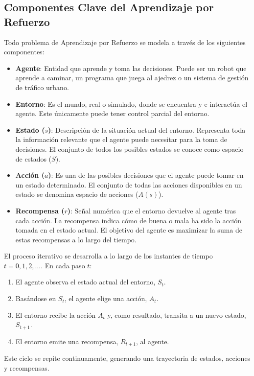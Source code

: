 \documentclass[12pt,a4paper]{book}
\begin{document}
\hrulefill

\subsection{Componentes Clave del Aprendizaje por Refuerzo}

Todo problema de Aprendizaje por Refuerzo se modela a través de los siguientes componentes:

\begin{itemize}
    \item \textbf{Agente}: Entidad que aprende y toma las decisiones. Puede ser un robot que aprende a caminar, un programa que juega al ajedrez o un sistema de gestión de tráfico urbano.
    \item \textbf{Entorno}: Es el mundo, real o simulado, donde se encuentra y e interactúa el agente. Este únicamente puede tener control parcial del entorno.
    \item \textbf{Estado ($s$)}: Descripción de la situación actual del entorno. Representa toda la información relevante que el agente puede necesitar para la toma de decisiones. El conjunto de todos los posibles estados se conoce como espacio de estados ($S$).
    \item \textbf{Acción ($a$)}: Es una de las posibles decisiones que el agente puede tomar en un estado determinado. El conjunto de todas las acciones disponibles en un estado se denomina espacio de acciones ($A(s)$).
    \item \textbf{Recompensa ($r$)}: Señal numérica que el entorno devuelve al agente tras cada acción. La recompensa indica cómo de buena o mala ha sido la acción tomada en el estado actual. El objetivo del agente es maximizar la suma de estas recompensas a lo largo del tiempo.
\end{itemize}

El proceso iterativo se desarrolla a lo largo de los instantes de tiempo $t=0, 1, 2, \dots$. En cada paso $t$:
\begin{enumerate}
    \item El agente observa el estado actual del entorno, $S_t$.
    \item Basándose en $S_t$, el agente elige una acción, $A_t$.
    \item El entorno recibe la acción $A_t$ y, como resultado, transita a un nuevo estado, $S_{t+1}$.
    \item El entorno emite una recompensa, $R_{t+1}$, al agente.
\end{enumerate}
Este ciclo se repite continuamente, generando una trayectoria de estados, acciones y recompensas.
\end{document}
